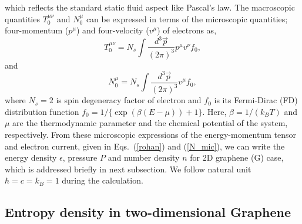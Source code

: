 \documentclass[%
 reprint,
 amsmath,amssymb,
 aps,
]{revtex4-2}
\newcommand{\ep}{\epsilon}
\begin{document}
    which reflects  the standard static fluid aspect like Pascal's law. The macroscopic quantities $T_0^{\mu \nu}$ and $N^\mu_0$ can be expressed in terms of the microscopic quantities; four-momentum ($p^{\mu}$) and four-velocity ($v^{\mu}$) of electrons as,
    \begin{equation}
    T_0^{\mu\nu} = N_s\int \frac{d^3\vec{p}}{(2\pi)^3}p^\mu v^\nu f_0,
    \label{rohan}
    \end{equation}
    and
    \begin{equation}
    N_0^{\mu} = N_s\int \frac{d^3\vec{p}}{(2\pi)^3} v^\mu f_0,
    \label{N_mic}
    \end{equation}
    where $N_s=2$ is spin degeneracy factor of electron and $f_0$ is its Fermi-Dirac (FD) distribution function $f_0=1/\{\exp{(\beta(E-\mu))}+1\}$. Here, $\beta=1/(k_B T)$ and $\mu$ are the thermodynamic parameter and the chemical potential of the system, respectively. From these microscopic expressions of the energy-momentum tensor and electron current, given in Eqs.~(\ref{rohan}) and (\ref{N_mic}), we can write the energy density $\ep$, pressure $P$ and number density $n$ for 2D graphene (G) case, which is addressed briefly in next subsection. We follow natural unit $\hbar=c=k_B=1$ during the calculation.
%
    \subsection{Entropy density in two-dimensional Graphene}
\end{document}
